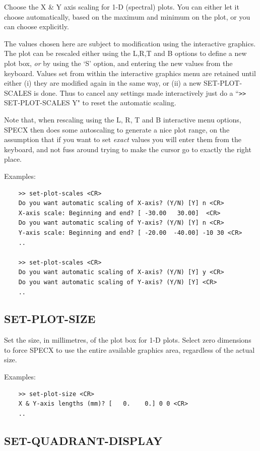 \documentclass[11pt,twoside]{report}
\begin{document}
Choose the X \& Y axis scaling for 1-D (spectral) plots. You can either
let it choose automatically, based on the maximum and minimum on the plot,
or you can choose explicitly.

The values chosen here are subject to modification using the interactive
graphics.  The plot can be rescaled either using
the L,R,T and B options to define a new plot box, {\em or} by using the `S'
option, and entering the new values from the keyboard. Values set from within
the interactive graphics menu are retained until either (i) they are modified
again in the same way, or (ii) a new SET-PLOT-SCALES is done. Thus to cancel
any settings made interactively just do a ``\verb+>>+ SET-PLOT-SCALES Y" to reset the
automatic scaling.

Note that, when rescaling using the L, R, T and B interactive menu options,
SPECX then does some autoscaling to generate a nice plot range, on the
assumption that if you want to set {\em exact} values you will enter them
from the keyboard, and not fuss around trying to make the cursor go to
exactly the right place.

Examples:
\begin{verbatim}
    >> set-plot-scales <CR>
    Do you want automatic scaling of X-axis? (Y/N) [Y] n <CR>
    X-axis scale: Beginning and end? [ -30.00   30.00]  <CR>
    Do you want automatic scaling of Y-axis? (Y/N) [Y] n <CR>
    Y-axis scale: Beginning and end? [ -20.00  -40.00] -10 30 <CR>
    ..

    >> set-plot-scales <CR>
    Do you want automatic scaling of X-axis? (Y/N) [Y] y <CR>
    Do you want automatic scaling of Y-axis? (Y/N) [Y] <CR>
    ..
\end{verbatim}


\subsection{SET-PLOT-SIZE} 

Set the size, in millimetres, of the plot box for 1-D plots. Select
zero dimensions to force SPECX to use the entire available graphics area,
regardless of the actual size.

Examples:
\begin{verbatim}
    >> set-plot-size <CR>
    X & Y-axis lengths (mm)? [   0.    0.] 0 0 <CR>
    ..
\end{verbatim}

\subsection{SET-QUADRANT-DISPLAY} 
\end{document}
